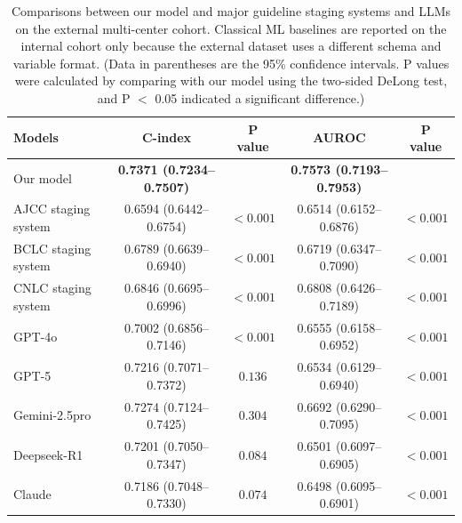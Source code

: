 \documentclass{article}
\begin{document}
\begin{table}[t]
    \centering
    \renewcommand\arraystretch{1.1}
    \setlength{\tabcolsep}{2.2mm}
    
    \caption{Comparisons between our model and major guideline staging systems and LLMs on the external multi-center cohort. Classical ML baselines are reported on the internal cohort only because the external dataset uses a different schema and variable format. (Data in parentheses are the 95\% confidence intervals. P values were calculated by comparing with our model using the two-sided DeLong test, and P $<$ 0.05 indicated a significant difference.)}
    \begin{tabular}{lcccc}
    \toprule
        Models & C-index & P value & AUROC & P value \\ \midrule
        Our model & \textbf{0.7371 (0.7234–0.7507)} & ~ & \textbf{0.7573 (0.7193–0.7953)} & ~ \\ 
        AJCC staging system & 0.6594 (0.6442–0.6754) & $<0.001$ & 0.6514 (0.6152–0.6876) & $<0.001$ \\ 
        BCLC staging system & 0.6789 (0.6639–0.6940) & $<0.001$ & 0.6719 (0.6347–0.7090) & $<0.001$ \\ 
        CNLC staging system & 0.6846 (0.6695–0.6996) & $<0.001$ & 0.6808 (0.6426–0.7189) & $<0.001$ \\ \midrule
        GPT-4o & 0.7002 (0.6856–0.7146) & $<0.001$ & 0.6555 (0.6158–0.6952) & $<0.001$ \\
        GPT-5 & 0.7216 (0.7071–0.7372) & $0.136$ & 0.6534 (0.6129–0.6940) & $<0.001$ \\ 
        Gemini-2.5pro & 0.7274 (0.7124–0.7425) & $0.304$ & 0.6692 (0.6290–0.7095) & $<0.001$ \\ 
        Deepseek-R1 & 0.7201 (0.7050–0.7347) & $0.084$ & 0.6501 (0.6097–0.6905) & $<0.001$ \\ 
        Claude & 0.7186 (0.7048–0.7330) & $0.074$ & 0.6498 (0.6095–0.6901) & $<0.001$ \\ \bottomrule
\end{tabular}
    \label{tab:cindex_auc_external}
\end{table}
\end{document}
